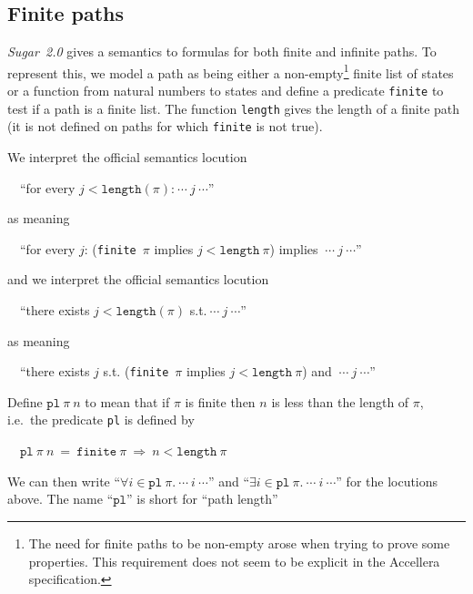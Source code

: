 \documentclass{llncs}
\newcommand{\pl}{\texttt{pl}\xspace}
\renewcommand{\sim}{\texttt{sim}\xspace}
\newcommand\Sugar{{\it{Sugar~2.0}}\xspace}
\renewcommand{\t}[1]{\texttt{#1}}
\begin{document}
\subsection{Finite paths}\label{finite}

\Sugar gives a semantics to formulas for both finite and infinite
paths.  To represent this, we model a path as being either a 
non-empty\footnote{The need for finite paths to be non-empty arose
when trying to prove some properties. This requirement does not seem to be explicit in
the Accellera specification.} finite
list of states or a function from natural numbers to states and define a
predicate \t{finite} to test if a path is a finite list. The function
\t{length} gives the length of a finite path (it is not defined on
paths for which \t{finite} is not true).

\noindent We interpret the official semantics locution 

~~``for every $j < \t{length}(\pi)$:$~\cdots~j~\cdots$''

\noindent as meaning 

~~``for every $j$: (\t{finite}~$\pi$ implies $j < \t{length}~\pi$) implies $~\cdots~j~\cdots$''

\noindent and we interpret the official semantics locution 

~~``there exists $j < \t{length}(\pi)$ s.t.$~\cdots~j~\cdots$''

\noindent as meaning 

~~``there exists $j$ s.t. (\t{finite}~$\pi$ implies $j < \t{length}~\pi$) and $~\cdots~j~\cdots$''

Define ${\pl~\pi~n}$ to mean that
if $\pi$ is finite then $n$ is
less than the length of $\pi$, i.e.~the predicate \pl is defined by

~~$\pl~\pi~n~=~\t{finite}~\pi~\Rightarrow~ n < \t{length}~\pi$

We can then write ``$\forall i\in\pl~\pi.~\cdots~i~\cdots$'' and ``$\exists i\in\pl~\pi.~\cdots~i~\cdots$''
for the locutions above. The name ``$\pl$'' is short for ``path length''

%
%
\end{document}
